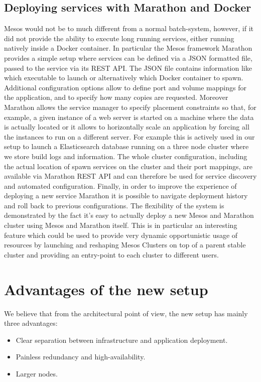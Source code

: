\documentclass[a4paper]{jpconf}
\begin{document}
\subsection{Deploying services with Marathon and Docker}

Mesos would not be to much different from a normal batch-system,
however, if it did not provide the ability to execute long running
services, either running natively inside a Docker container. In
particular the Mesos framework Marathon provides a simple setup where
services can be defined via a JSON formatted file, passed to the
service via its REST API\@. The JSON file contains information like
which executable to launch or alternatively which Docker container
to spawn. Additional configuration options allow to define port and
volume mappings for the application, and to specify how many copies
are requested. Moreover Marathon allows the service manager to specify
placement constraints so that, for example, a given instance of a web
server is started on a machine where the data is actually located or
it allows to horizontally scale an application by forcing all the
instances to run on a different server. For example this is actively
used in our setup to launch a Elasticsearch database running on a three
node cluster where we store build logs and information. The whole
cluster configuration, including the actual location of spawn services
on the cluster and their port mappings, are available via Marathon
REST API and can therefore be used for service discovery and automated
configuration. Finally, in order to improve the experience of deploying
a new service Marathon it is possible to navigate deployment history and
roll back to previous configurations. The flexibility of the system is
demonstrated by the fact it's easy to actually deploy a new Mesos and
Marathon cluster using Mesos and Marathon itself. This is in particular
an interesting feature which could be used to provide very dynamic
opportunistic usage of resources by launching and reshaping Mesos
Clusters on top of a parent stable cluster and providing an entry-point
to each cluster to different users.

\section{Advantages of the new setup}

We believe that from the architectural point of view, the new setup has mainly
three advantages:

\begin{itemize}

\item Clear separation between infrastructure and application deployment.

\item Painless redundancy and high-availability.

\item Larger nodes.

\end{itemize}
\end{document}
